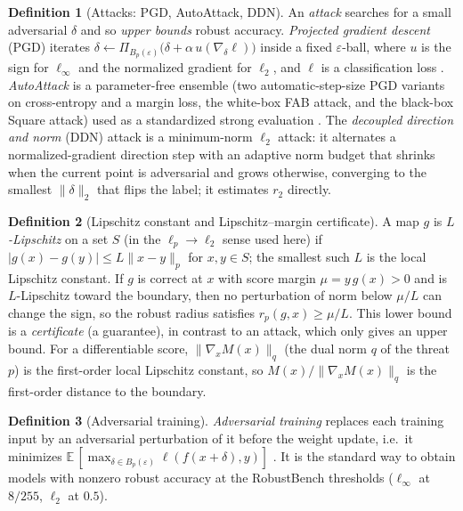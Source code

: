 \documentclass[11pt]{article}
\theoremstyle{plain}
\theoremstyle{definition}
\newtheorem{definition}{Definition}
\theoremstyle{remark}
\newcommand{\E}{\mathbb{E}}
\begin{document}
\begin{definition}[Attacks: PGD, AutoAttack, DDN]\label{def:attacks}
An \emph{attack} searches for a small adversarial $\delta$ and so \emph{upper bounds} robust accuracy.  \emph{Projected gradient descent} (PGD) iterates $\delta\leftarrow \Pi_{B_p(\varepsilon)}\big(\delta+\alpha\,u(\nabla_\delta \ell)\big)$ inside a fixed $\varepsilon$-ball, where $u$ is the sign for $\ell_\infty$ and the normalized gradient for $\ell_2$, and $\ell$ is a classification loss \citep{Madry2018}.  \emph{AutoAttack} is a parameter-free ensemble (two automatic-step-size PGD variants on cross-entropy and a margin loss, the white-box FAB attack, and the black-box Square attack) used as a standardized strong evaluation \citep{AutoAttack2020}.  The \emph{decoupled direction and norm} (DDN) attack \citep{Rony2019} is a minimum-norm $\ell_2$ attack: it alternates a normalized-gradient direction step with an adaptive norm budget that shrinks when the current point is adversarial and grows otherwise, converging to the smallest $\|\delta\|_2$ that flips the label; it estimates $r_2$ directly.
\end{definition}

\begin{definition}[Lipschitz constant and Lipschitz--margin certificate]\label{def:lip}
A map $g$ is \emph{$L$-Lipschitz} on a set $S$ (in the $\ell_p\!\to\!\ell_2$ sense used here) if $|g(x)-g(y)|\le L\|x-y\|_p$ for $x,y\in S$; the smallest such $L$ is the local Lipschitz constant.  If $g$ is correct at $x$ with score margin $\mu=y\,g(x)>0$ and is $L$-Lipschitz toward the boundary, then no perturbation of norm below $\mu/L$ can change the sign, so the robust radius satisfies $r_p(g,x)\ge \mu/L$.  This lower bound is a \emph{certificate} (a guarantee), in contrast to an attack, which only gives an upper bound.  For a differentiable score, $\|\nabla_x M(x)\|_q$ (the dual norm $q$ of the threat $p$) is the first-order local Lipschitz constant, so $M(x)/\|\nabla_x M(x)\|_q$ is the first-order distance to the boundary.
\end{definition}

\begin{definition}[Adversarial training]
\emph{Adversarial training} replaces each training input by an adversarial perturbation of it before the weight update, i.e.\ it minimizes $\E\,[\max_{\delta\in B_p(\varepsilon)}\ell(f(x+\delta),y)]$ \citep{Madry2018}.  It is the standard way to obtain models with nonzero robust accuracy at the RobustBench thresholds ($\ell_\infty$ at $8/255$, $\ell_2$ at $0.5$).
\end{definition}
\end{document}

